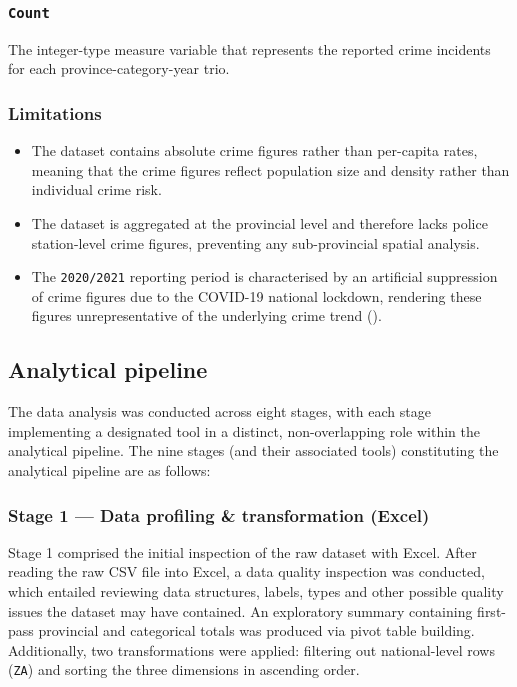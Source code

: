 \documentclass[titlepage, 12pt, oneside]{article}
\numberwithin{equation}{section}
\begin{document}
	\subsubsection*{\texttt{Count}} 
	The integer-type measure variable that represents the reported crime incidents for each province-category-year trio. 
	\subsubsection*{Limitations}   \label{limitations}
    \begin{itemize}
    	\item The dataset contains absolute crime figures rather than per-capita rates, meaning that the crime figures reflect population size and density rather than individual crime risk.
    	\item The dataset is aggregated at the provincial level and therefore lacks police station-level crime figures, preventing any sub-provincial spatial analysis. 
    	\item The \texttt{2020/2021} reporting period is characterised by an artificial suppression of crime figures due to the COVID-19 national lockdown, rendering these figures unrepresentative of the underlying crime trend (\cite{faull2021}).
    \end{itemize}
	
	\subsection{Analytical pipeline}
	The data analysis was conducted across eight stages, with each stage implementing a designated tool in a distinct, non-overlapping role within the analytical pipeline. The nine stages (and their associated tools) constituting the analytical pipeline are as follows:
	
	\subsubsection*{Stage 1 --- Data profiling \& transformation (Excel)} \label{stage1}
	Stage 1 comprised the initial inspection of the raw dataset with Excel. After reading the raw CSV file into Excel, a data quality inspection was conducted, which entailed reviewing data structures, labels, types and other possible quality issues the dataset may have contained. An exploratory summary containing first-pass provincial and categorical totals was produced via pivot table building. Additionally, two transformations were applied: filtering out national-level rows (\texttt{ZA}) and sorting the three dimensions in ascending order.
	
\end{document}
